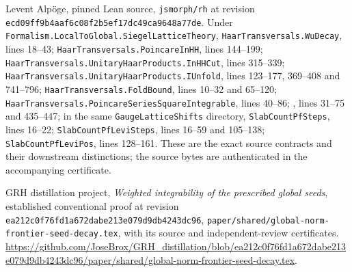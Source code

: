 Levent Alp\"oge, pinned Lean source,
\texttt{jsmorph/rh} at revision
\texttt{ecd09ff9b4aaf6c08f2b5ef17dc49ca9648a77de}.
Under \texttt{Formalism.LocalToGlobal.SiegelLatticeTheory},
\texttt{HaarTransversals.WuDecay}, lines 18--43;
\texttt{HaarTransversals.PoincareInHH}, lines 144--199;
\texttt{HaarTransversals.UnitaryHaarProducts.InHHCut}, lines 315--339;
\texttt{HaarTransversals.UnitaryHaarProducts.IUnfold}, lines 123--177,
369--408 and 741--796;
\texttt{HaarTransversals.FoldBound}, lines 10--32 and 65--120;
\texttt{HaarTransversals.PoincareSeriesSquareIntegrable}, lines 40--86;
,
lines 31--75 and 435--447;
in the same \texttt{GaugeLatticeShifts} directory,
\texttt{SlabCountPfSteps}, lines 16--22;
\texttt{SlabCountPfLeviSteps}, lines 16--59 and 105--138;
\texttt{SlabCountPfLeviPos}, lines 128--161.
These are the exact source contracts and their downstream distinctions;
the source bytes are authenticated in the accompanying certificate.

GRH distillation project, \emph{Weighted integrability of the prescribed
global seeds}, established conventional proof at revision
\texttt{ea212c0f76fd1a672dabe213e079d9db4243dc96},
\texttt{paper/shared/global-norm-frontier-seed-decay.tex}, with its
source and independent-review certificates.
\url{https://github.com/JoseBrox/GRH_distillation/blob/ea212c0f76fd1a672dabe213e079d9db4243dc96/paper/shared/global-norm-frontier-seed-decay.tex}.
